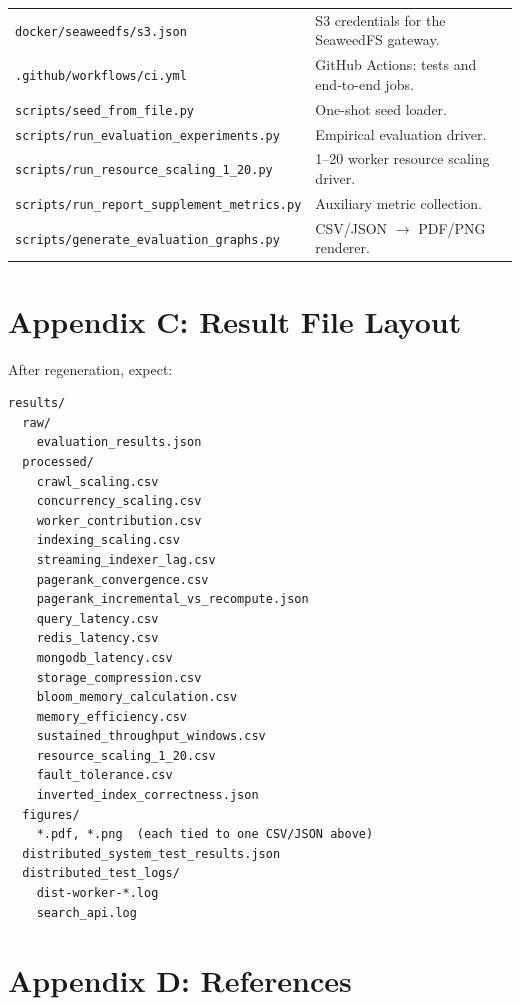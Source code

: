 \documentclass[11pt,a4paper]{article}
\newcommand{\code}[1]{\texttt{#1}}
\begin{document}
\begin{table}[H]
\begin{tabular}{p{}p{}}
\code{docker/seaweedfs/s3.json} & S3 credentials for the SeaweedFS gateway.\\
\code{.github/workflows/ci.yml} & GitHub Actions: tests and end-to-end jobs.\\
\code{scripts/seed\_from\_file.py} & One-shot seed loader.\\
\code{scripts/run\_evaluation\_experiments.py} & Empirical evaluation driver.\\
\code{scripts/run\_resource\_scaling\_1\_20.py} & 1--20 worker resource scaling driver.\\
\code{scripts/run\_report\_supplement\_metrics.py} & Auxiliary metric collection.\\
\code{scripts/generate\_evaluation\_graphs.py} & CSV/JSON $\to$ PDF/PNG renderer.\\
\bottomrule
\end{tabular}
\normalsize
\end{table}

\section{Appendix C: Result File Layout}

After regeneration, expect:

\begin{verbatim}
results/
  raw/
    evaluation_results.json
  processed/
    crawl_scaling.csv
    concurrency_scaling.csv
    worker_contribution.csv
    indexing_scaling.csv
    streaming_indexer_lag.csv
    pagerank_convergence.csv
    pagerank_incremental_vs_recompute.json
    query_latency.csv
    redis_latency.csv
    mongodb_latency.csv
    storage_compression.csv
    bloom_memory_calculation.csv
    memory_efficiency.csv
    sustained_throughput_windows.csv
    resource_scaling_1_20.csv
    fault_tolerance.csv
    inverted_index_correctness.json
  figures/
    *.pdf, *.png  (each tied to one CSV/JSON above)
  distributed_system_test_results.json
  distributed_test_logs/
    dist-worker-*.log
    search_api.log
\end{verbatim}

\section{Appendix D: References}
\end{document}

